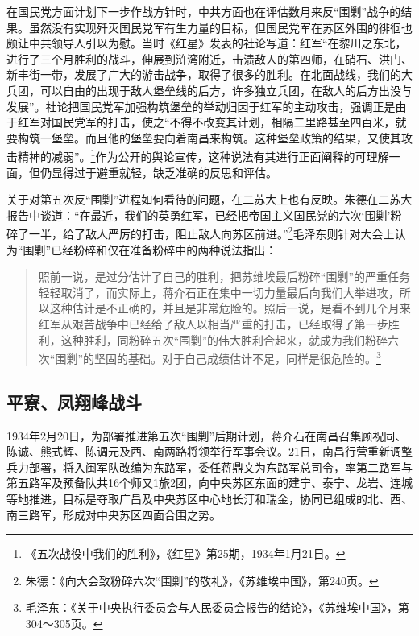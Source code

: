 在国民党方面计划下一步作战方针时，中共方面也在评估数月来反“围剿”战争的结果。虽然没有实现歼灭国民党军有生力量的目标，但国民党军在苏区外围的徘徊也颇让中共领导人引以为慰。当时《红星》发表的社论写道：红军“在黎川之东北，进行了三个月胜利的战斗，伸展到浒湾附近，击溃敌人的第四师，在硝石、洪门、新丰街一带，发展了广大的游击战争，取得了很多的胜利。在北面战线，我们的大兵团，可以自由的出现于敌人堡垒线的后方，许多独立兵团，在敌人的后方出没与发展”。社论把国民党军加强构筑堡垒的举动归因于红军的主动攻击，强调正是由于红军对国民党军的打击，使之“不得不改变其计划，相隔二里路甚至四百米，就要构筑一堡垒。而且他的堡垒要向着南昌来构筑。这种堡垒政策的结果，又使其攻击精神的减弱”。\footnote{《五次战役中我们的胜利》，《红星》第25期，1934年1月21日。}作为公开的舆论宣传，这种说法有其进行正面阐释的可理解一面，但仍显得过于避重就轻，缺乏准确的反思和评估。


关于对第五次反“围剿”进程如何看待的问题，在二苏大上也有反映。朱德在二苏大报告中谈道：“在最近，我们的英勇红军，已经把帝国主义国民党的六次‘围剿’粉碎了一半，给了敌人严厉的打击，阻止敌人向苏区前进。”\footnote{朱德：《向大会致粉碎六次“围剿”的敬礼》，《苏维埃中国》，第240页。}毛泽东则针对大会上认为“围剿”已经粉碎和仅在准备粉碎中的两种说法指出：

\begin{quote}

照前一说，是过分估计了自己的胜利，把苏维埃最后粉碎“围剿”的严重任务轻轻取消了，而实际上，蒋介石正在集中一切力量最后向我们大举进攻，所以这种估计是不正确的，并且是非常危险的。照后一说，是看不到几个月来红军从艰苦战争中已经给了敌人以相当严重的打击，已经取得了第一步胜利，这种胜利，同粉碎五次“围剿”的伟大胜利合起来，就成为我们粉碎六次“围剿”的坚固的基础。对于自己成绩估计不足，同样是很危险的。\footnote{毛泽东：《关于中央执行委员会与人民委员会报告的结论》，《苏维埃中国》，第304～305页。}
\end{quote}

\subsection{平寮、凤翔峰战斗}


1934年2月20日，为部署推进第五次“围剿”后期计划，蒋介石在南昌召集顾祝同、陈诚、熊式辉、陈调元及西、南两路将领举行军事会议。21日，南昌行营重新调整兵力部署，将入闽军队改编为东路军，委任蒋鼎文为东路军总司令，率第二路军与第五路军及预备队共16个师又1旅2团，向中央苏区东面的建宁、泰宁、龙岩、连城等地推进，目标是夺取广昌及中央苏区中心地长汀和瑞金，协同已组成的北、西、南三路军，形成对中央苏区四面合围之势。


